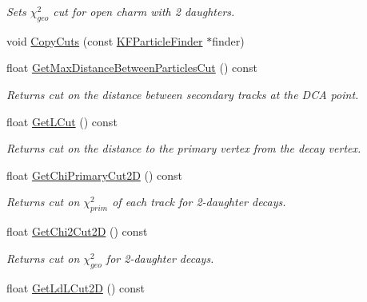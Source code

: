 \begin{DoxyCompactItemize}
\begin{DoxyCompactList}\small\item\em Sets $\chi^2_{geo}$ cut for open charm with 2 daughters. \end{DoxyCompactList}\item 
void \hyperlink{classKFParticleFinder_a1b38034cef5265388c31a57664bd10db}{Copy\+Cuts} (const \hyperlink{classKFParticleFinder}{K\+F\+Particle\+Finder} $\ast$finder)
\item 
float \hyperlink{classKFParticleFinder_a4d64b5ad2217e309115cc18b2690d69d}{Get\+Max\+Distance\+Between\+Particles\+Cut} () const \hypertarget{classKFParticleFinder_a4d64b5ad2217e309115cc18b2690d69d}{}\label{classKFParticleFinder_a4d64b5ad2217e309115cc18b2690d69d}

\begin{DoxyCompactList}\small\item\em Returns cut on the distance between secondary tracks at the D\+CA point. \end{DoxyCompactList}\item 
float \hyperlink{classKFParticleFinder_ab82d952f5853ebc2abb65f7107026f47}{Get\+L\+Cut} () const \hypertarget{classKFParticleFinder_ab82d952f5853ebc2abb65f7107026f47}{}\label{classKFParticleFinder_ab82d952f5853ebc2abb65f7107026f47}

\begin{DoxyCompactList}\small\item\em Returns cut on the distance to the primary vertex from the decay vertex. \end{DoxyCompactList}\item 
float \hyperlink{classKFParticleFinder_ab56fca07eaa71d8bf3769954d32875ce}{Get\+Chi\+Primary\+Cut2D} () const \hypertarget{classKFParticleFinder_ab56fca07eaa71d8bf3769954d32875ce}{}\label{classKFParticleFinder_ab56fca07eaa71d8bf3769954d32875ce}

\begin{DoxyCompactList}\small\item\em Returns cut on $\chi^2_{prim}$ of each track for 2-\/daughter decays. \end{DoxyCompactList}\item 
float \hyperlink{classKFParticleFinder_a7291796e94721d1e40e03ae857ac0660}{Get\+Chi2\+Cut2D} () const \hypertarget{classKFParticleFinder_a7291796e94721d1e40e03ae857ac0660}{}\label{classKFParticleFinder_a7291796e94721d1e40e03ae857ac0660}

\begin{DoxyCompactList}\small\item\em Returns cut on $\chi^2_{geo}$ for 2-\/daughter decays. \end{DoxyCompactList}\item 
float \hyperlink{classKFParticleFinder_ac0e935ba7d17dd432458d81a84c747a3}{Get\+Ld\+L\+Cut2D} () const \hypertarget{classKFParticleFinder_ac0e935ba7d17dd432458d81a84c747a3}{}\label{classKFParticleFinder_ac0e935ba7d17dd432458d81a84c747a3}


\end{DoxyCompactItemize}
